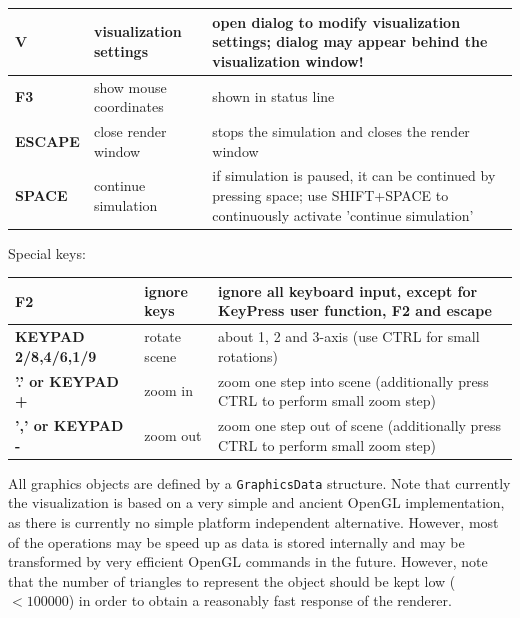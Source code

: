 \documentclass[11pt,a4paper]{book}
\newcommand{\refSection}[1]{\hyperref[#1]{\underline{Section \ref*{#1}}}} %
\begin{document}
\begin{center}
\begin{longtable}{| p{4cm} | p{4cm} | p{8cm} |}
	\bf V & visualization settings & open dialog to modify visualization settings; dialog may appear behind the visualization window! \\ \hline
	\bf F3 & show mouse coordinates& shown in status line \\ \hline
  \bf ESCAPE & close render window & stops the simulation and closes the render window \\ \hline
  \bf SPACE & continue simulation & if simulation is paused, it can be continued by pressing space; use SHIFT+SPACE to continuously activate 'continue simulation'\\ \hline
%
  \end{longtable}
\end{center}

Special keys:
\begin{center}
  \footnotesize
  \begin{longtable}{| p{4cm} | p{4cm} | p{8cm} |} 
	\hline
	\bf F2 & ignore keys & ignore all keyboard input, except for KeyPress user function, F2 and escape \\ \hline
  \bf KEYPAD 2/8,4/6,1/9 & rotate scene & about 1, 2 and 3-axis (use CTRL for small rotations) \\ \hline
  \bf '.' or KEYPAD + & zoom in & zoom one step into scene (additionally press CTRL to perform small zoom step)\\ \hline
  \bf ',' or KEYPAD - & zoom out & zoom one step out of scene (additionally press CTRL to perform small zoom step)\\ \hline
  \end{longtable}
\end{center}

\label{sec:graphicsData}
All graphics objects are defined by a \texttt{GraphicsData} structure.%
Note that currently the visualization is based on a very simple and ancient OpenGL implementation, as there is currently no simple platform independent alternative. However, most of the operations may be speed up as data is stored internally and may be transformed by very efficient OpenGL commands in the future. However, note that the number of triangles to represent the object should be kept low ($<100000$) in order to obtain a reasonably fast response of the renderer.
\end{document}

